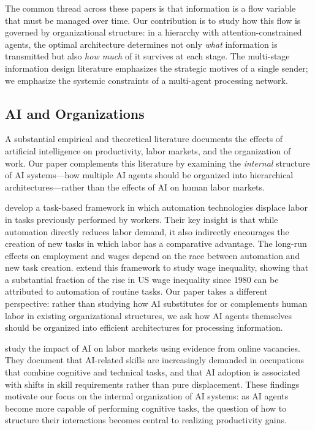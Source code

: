 The common thread across these papers is that information is a flow variable that must be managed over time. Our contribution is to study how this flow is governed by organizational structure: in a hierarchy with attention-constrained agents, the optimal architecture determines not only \emph{what} information is transmitted but also \emph{how much} of it survives at each stage. The multi-stage information design literature emphasizes the strategic motives of a single sender; we emphasize the systemic constraints of a multi-agent processing network.


\subsection{AI and Organizations}

A substantial empirical and theoretical literature documents the effects of artificial intelligence on productivity, labor markets, and the organization of work. Our paper complements this literature by examining the \emph{internal} structure of AI systems---how multiple AI agents should be organized into hierarchical architectures---rather than the effects of AI on human labor markets.

\citet{acemoglu2018race} develop a task-based framework in which automation technologies displace labor in tasks previously performed by workers. Their key insight is that while automation directly reduces labor demand, it also indirectly encourages the creation of new tasks in which labor has a comparative advantage. The long-run effects on employment and wages depend on the race between automation and new task creation. \citet{acemoglu2022tasks} extend this framework to study wage inequality, showing that a substantial fraction of the rise in US wage inequality since 1980 can be attributed to automation of routine tasks. Our paper takes a different perspective: rather than studying how AI substitutes for or complements human labor in existing organizational structures, we ask how AI agents themselves should be organized into efficient architectures for processing information.

\citet{acemoglu2022ai} study the impact of AI on labor markets using evidence from online vacancies. They document that AI-related skills are increasingly demanded in occupations that combine cognitive and technical tasks, and that AI adoption is associated with shifts in skill requirements rather than pure displacement. These findings motivate our focus on the internal organization of AI systems: as AI agents become more capable of performing cognitive tasks, the question of how to structure their interactions becomes central to realizing productivity gains.

